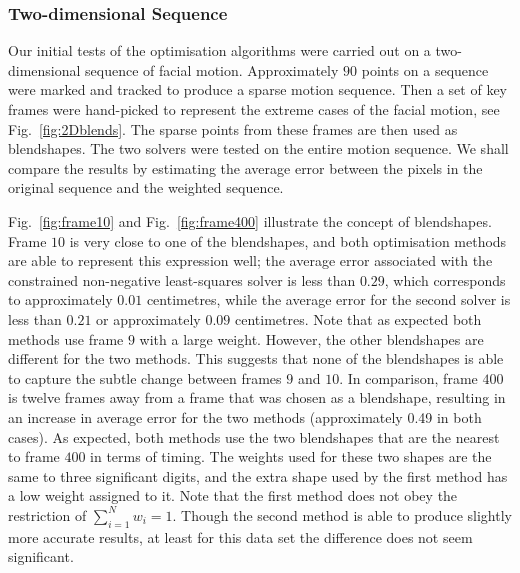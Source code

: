 \subsubsection{Two-dimensional Sequence}

Our initial tests of the optimisation algorithms were carried out on a two-dimensional sequence of facial motion. Approximately $90$ points on a sequence were marked and tracked to produce a sparse motion sequence. Then a set of key frames were hand-picked to represent the extreme cases of the facial motion, see Fig.~\ref{fig:2Dblends}. The sparse points from these frames are then used as blendshapes. The two solvers were tested on the entire motion sequence. We shall compare the results by estimating the average error between the pixels in the original sequence and the weighted sequence.

Fig.~\ref{fig:frame10} and Fig.~\ref{fig:frame400} illustrate the concept of blendshapes. Frame $10$ is very close to one of the blendshapes, and both optimisation methods are able to represent this expression well; the average error associated with the constrained non-negative least-squares solver is less than $0.29$, which corresponds to approximately $0.01$ centimetres, while the average error for the second solver is less than $0.21$ or approximately $0.09$ centimetres. Note that as expected both methods use frame $9$ with a large weight. However, the other blendshapes are different for the two methods. This suggests that none of the blendshapes is able to capture the subtle change between frames $9$ and $10$. In comparison, frame $400$ is twelve frames away from a frame that was chosen as a blendshape, resulting in an increase in average error for the two methods (approximately 0.49 in both cases). As expected, both methods use the two blendshapes that are the nearest to frame $400$ in terms of timing. The weights used for these two shapes are the same to three significant digits, and the extra shape used by the first method has a low weight assigned to it. Note that the first method does not obey the restriction of $\sum_{i=1}^N w_i = 1$. Though the second method is able to produce slightly more accurate results, at least for this data set the difference does not seem significant. 

